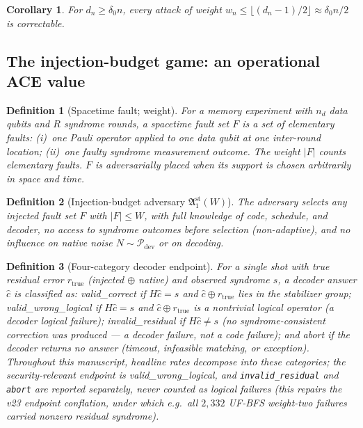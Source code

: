 \documentclass[11pt,a4paper]{article}
\newtheorem{corollary}{Corollary}\newtheorem{proposition}{Proposition}
\newtheorem{definition}{Definition}\newtheorem{assumption}{Assumption}
\begin{document}
\begin{corollary}
For $d_n\ge\delta_0 n$, every attack of weight
$w_n\le\lfloor(d_n-1)/2\rfloor\approx\delta_0 n/2$ is correctable.
\end{corollary}

\subsection{The injection-budget game: an operational ACE value}

\begin{definition}[Spacetime fault; weight]\label{def:fault}
For a memory experiment with $n_d$ data qubits and $R$ syndrome rounds,
a \emph{spacetime fault set} $F$ is a set of elementary faults:
(i)~one Pauli operator applied to one data qubit at one inter-round
location; (ii)~one faulty syndrome measurement outcome. The weight
$|F|$ counts elementary faults. $F$ is \emph{adversarially placed} when
its support is chosen arbitrarily in space and time.
\end{definition}

\begin{definition}[Injection-budget adversary $\mathfrak{A}_1^{\mathrm{st}}(W)$]
\label{def:adversary}
The adversary selects any injected fault set $F$ with $|F|\le W$, with
full knowledge of code, schedule, and decoder, no access to syndrome
outcomes before selection (non-adaptive), and no influence on native
noise $N\sim\mathcal{P}_{\mathrm{dev}}$ or on decoding.
\end{definition}

\begin{definition}[Four-category decoder endpoint]\label{def:endpoint}
For a single shot with true residual error $r_{\mathrm{true}}$ (injected
$\oplus$ native) and observed syndrome $s$, a decoder answer
$\hat c$ is classified as: \emph{valid\_correct} if $H\hat c=s$ and
$\hat c\oplus r_{\mathrm{true}}$ lies in the stabilizer group;
\emph{valid\_wrong\_logical} if $H\hat c=s$ and
$\hat c\oplus r_{\mathrm{true}}$ is a nontrivial logical operator (a
decoder logical failure); \emph{invalid\_residual} if
$H\hat c\neq s$ (no syndrome-consistent correction was produced --- a
decoder failure, not a code failure); and \emph{abort} if the decoder
returns no answer (timeout, infeasible matching, or exception).
Throughout this manuscript, headline rates decompose into these
categories; the security-relevant endpoint is
\emph{valid\_wrong\_logical}, and \texttt{invalid\_residual} and
\texttt{abort} are reported separately, never counted as logical
failures (this repairs the v23 endpoint conflation, under which e.g.\
all $2{,}332$ UF-BFS weight-two failures carried nonzero residual
syndrome).
\end{definition}
\end{document}
